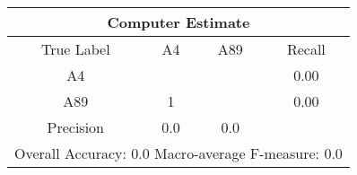 \begin{tabular}{|c||c|c||c|}
\hline 
\multicolumn{4}{|c|}{Computer Estimate}\\
\hline 
True Label & A4 & A89 & Recall \\
\hline 
A4 &  & & 0.00\\
A89 & 1 &  & 0.00\\
\hline 
Precision & 0.0 & 0.0 & \\
\hline 
\multicolumn{4}{|c|}{Overall Accuracy: 0.0 Macro-average F-measure: 0.0}\\
\hline 
\end{tabular} 
